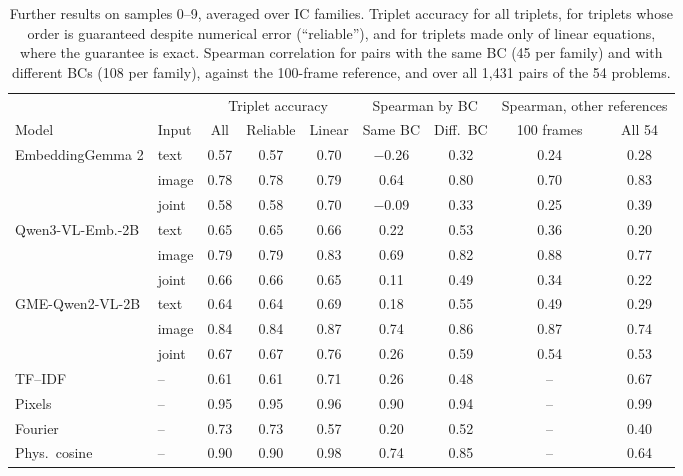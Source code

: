 \begin{table}[t]
\centering
\caption{Further results on samples 0--9, averaged over IC families. Triplet accuracy for all triplets, for triplets whose order is guaranteed despite numerical error (``reliable''), and for triplets made only of linear equations, where the guarantee is exact. Spearman correlation for pairs with the same BC (45 per family) and with different BCs (108 per family), against the 100-frame reference, and over all 1,431 pairs of the 54 problems.}
\label{tab:secondary}
\small
\begin{tabular}{llccccccc}
\toprule
& & \multicolumn{3}{c}{Triplet accuracy} & \multicolumn{2}{c}{Spearman by BC} & \multicolumn{2}{c}{Spearman, other references} \\
\cmidrule(lr){3-5}\cmidrule(lr){6-7}\cmidrule(lr){8-9}
Model & Input & All & Reliable & Linear & Same BC & Diff.\ BC & 100 frames & All 54 \\
\midrule
EmbeddingGemma 2 & text & 0.57 & 0.57 & 0.70 & $-$0.26 & 0.32 & 0.24 & 0.28 \\
 & image & 0.78 & 0.78 & 0.79 & 0.64 & 0.80 & 0.70 & 0.83 \\
 & joint & 0.58 & 0.58 & 0.70 & $-$0.09 & 0.33 & 0.25 & 0.39 \\
Qwen3-VL-Emb.-2B & text & 0.65 & 0.65 & 0.66 & 0.22 & 0.53 & 0.36 & 0.20 \\
 & image & 0.79 & 0.79 & 0.83 & 0.69 & 0.82 & 0.88 & 0.77 \\
 & joint & 0.66 & 0.66 & 0.65 & 0.11 & 0.49 & 0.34 & 0.22 \\
GME-Qwen2-VL-2B & text & 0.64 & 0.64 & 0.69 & 0.18 & 0.55 & 0.49 & 0.29 \\
 & image & 0.84 & 0.84 & 0.87 & 0.74 & 0.86 & 0.87 & 0.74 \\
 & joint & 0.67 & 0.67 & 0.76 & 0.26 & 0.59 & 0.54 & 0.53 \\
TF--IDF & -- & 0.61 & 0.61 & 0.71 & 0.26 & 0.48 & -- & 0.67 \\
Pixels & -- & 0.95 & 0.95 & 0.96 & 0.90 & 0.94 & -- & 0.99 \\
Fourier & -- & 0.73 & 0.73 & 0.57 & 0.20 & 0.52 & -- & 0.40 \\
Phys.\ cosine & -- & 0.90 & 0.90 & 0.98 & 0.74 & 0.85 & -- & 0.64 \\
\bottomrule
\end{tabular}
\end{table}
